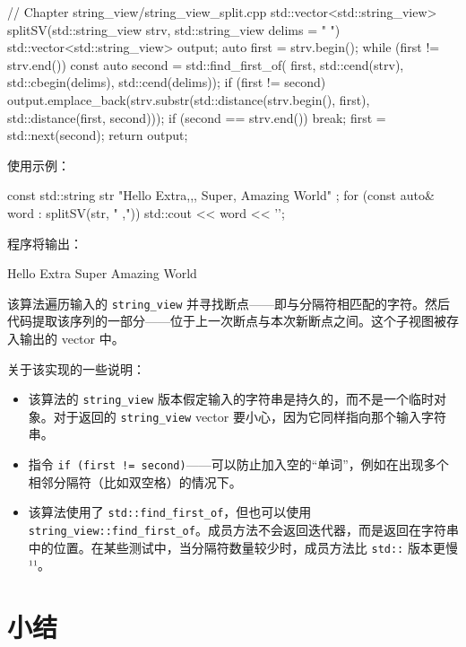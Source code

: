 \begin{codebox}[cpp]
// Chapter string_view/string_view_split.cpp
std::vector<std::string_view>
splitSV(std::string_view strv, std::string_view delims = " ")
{
std::vector<std::string_view> output;
auto first = strv.begin();
while (first != strv.end())
{
const auto second = std::find_first_of(
first, std::cend(strv),
std::cbegin(delims), std::cend(delims));
if (first != second)
{
output.emplace_back(strv.substr(std::distance(strv.begin(), first),
std::distance(first, second)));
}
if (second == strv.end())
break;
first = std::next(second);
}
return output;
}
\end{codebox}

使用示例：

\begin{codebox}[cpp]
const std::string str {
"Hello
Extra,,, Super, Amazing World"
};
for (const auto& word : splitSV(str, " ,"))
std::cout << word << '\n';
\end{codebox}

程序将输出：

\begin{codebox}
Hello
Extra
Super
Amazing
World
\end{codebox}

该算法遍历输入的 \texttt{string\_view} 并寻找断点——即与分隔符相匹配的字符。然后代码提取该序列的一部分——位于上一次断点与本次新断点之间。这个子视图被存入输出的 vector 中。

关于该实现的一些说明：

\begin{itemize}
\item 该算法的 \texttt{string\_view} 版本假定输入的字符串是持久的，而不是一个临时对象。对于返回的 \texttt{string\_view} vector 要小心，因为它同样指向那个输入字符串。
\item 指令 \texttt{if (first != second)}——可以防止加入空的“单词”，例如在出现多个相邻分隔符（比如双空格）的情况下。
\item 该算法使用了 \texttt{std::find\_first\_of}，但也可以使用 \texttt{string\_view::find\_first\_of}。成员方法不会返回迭代器，而是返回在字符串中的位置。在某些测试中，当分隔符数量较少时，成员方法比 \texttt{std::} 版本更慢¹¹。
\end{itemize}


\section{小结}

